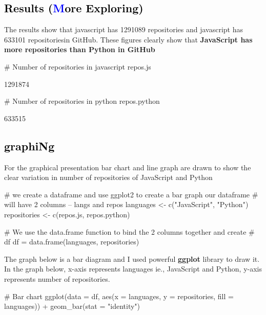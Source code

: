 \documentclass{article}\usepackage[]{graphicx}\usepackage[]{color}
\begin{document}
{\subsection*{\Large\textcolor{black}{Results (\textcolor{blue}{M}\textcolor{black}{ore Exploring)}}}
The results show that javascript has 1291089 repositories and javascript has 633101 repositoriesin GitHub. These figures clearly show that \textbf{JavaScript has more repositories than Python in GitHub}

\begin{Schunk}
\begin{Sinput}
# Number of repositories in javascript
repos.js
\end{Sinput}
\begin{Soutput}
[1] 1291874
\end{Soutput}
\begin{Sinput}
# Number of repositories in python
repos.python
\end{Sinput}
\begin{Soutput}
[1] 633515
\end{Soutput}
\end{Schunk}

\subsection*{\Large\textcolor{black}{graphiNg}}
For the graphical presentation bar chart and line graph are drawn to show the clear variation in number of repositories of JavaScript and Python

\begin{Schunk}
\begin{Sinput}
# we create a dataframe and use ggplot2 to create a bar graph our dataframe
# will have 2 columns -- langs and repos
languages <- c("JavaScript", "Python")
repositories <- c(repos.js, repos.python)

# We use the data.frame function to bind the 2 columns together and create
# df
df = data.frame(languages, repositories)
\end{Sinput}
\end{Schunk}

The graph below is a bar diagram and I used powerful \textbf{ggplot} library to draw it. In the graph below, x-axis represents languages ie., JavaScript and Python, y-axis represents number of repositories.  

\begin{Schunk}
\begin{Sinput}
# Bar chart
ggplot(data = df, aes(x = languages, y = repositories, fill = languages)) + 
    geom_bar(stat = "identity")
\end{Sinput}


\end{Schunk}}
\end{document}
